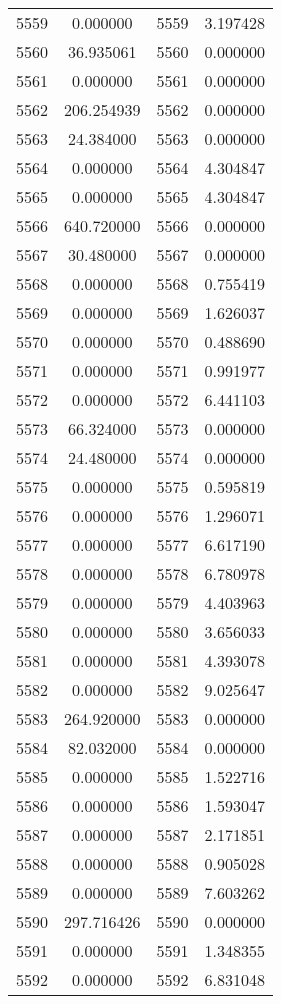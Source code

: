 \documentclass[12pt]{article}
\begin{document}
\begin{longtable}{@{}cccc@{}}
5559 & 0.000000 & 5559 & 3.197428 \\
5560 & 36.935061 & 5560 & 0.000000 \\
5561 & 0.000000 & 5561 & 0.000000 \\
5562 & 206.254939 & 5562 & 0.000000 \\
5563 & 24.384000 & 5563 & 0.000000 \\
5564 & 0.000000 & 5564 & 4.304847 \\
5565 & 0.000000 & 5565 & 4.304847 \\
5566 & 640.720000 & 5566 & 0.000000 \\
5567 & 30.480000 & 5567 & 0.000000 \\
5568 & 0.000000 & 5568 & 0.755419 \\
5569 & 0.000000 & 5569 & 1.626037 \\
5570 & 0.000000 & 5570 & 0.488690 \\
5571 & 0.000000 & 5571 & 0.991977 \\
5572 & 0.000000 & 5572 & 6.441103 \\
5573 & 66.324000 & 5573 & 0.000000 \\
5574 & 24.480000 & 5574 & 0.000000 \\
5575 & 0.000000 & 5575 & 0.595819 \\
5576 & 0.000000 & 5576 & 1.296071 \\
5577 & 0.000000 & 5577 & 6.617190 \\
5578 & 0.000000 & 5578 & 6.780978 \\
5579 & 0.000000 & 5579 & 4.403963 \\
5580 & 0.000000 & 5580 & 3.656033 \\
5581 & 0.000000 & 5581 & 4.393078 \\
5582 & 0.000000 & 5582 & 9.025647 \\
5583 & 264.920000 & 5583 & 0.000000 \\
5584 & 82.032000 & 5584 & 0.000000 \\
5585 & 0.000000 & 5585 & 1.522716 \\
5586 & 0.000000 & 5586 & 1.593047 \\
5587 & 0.000000 & 5587 & 2.171851 \\
5588 & 0.000000 & 5588 & 0.905028 \\
5589 & 0.000000 & 5589 & 7.603262 \\
5590 & 297.716426 & 5590 & 0.000000 \\
5591 & 0.000000 & 5591 & 1.348355 \\
5592 & 0.000000 & 5592 & 6.831048 \\

\end{longtable}
\end{document}
